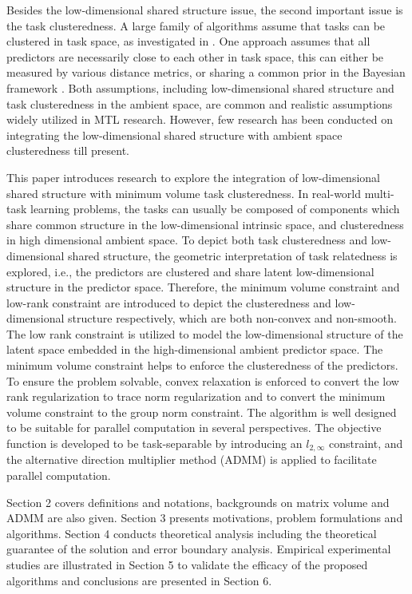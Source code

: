 \documentclass[twoside,leqno,twocolumn]{article}
\begin{document}
Besides the low-dimensional shared structure issue, the second important
issue is the task clusteredness. A large family of algorithms assume
that tasks can be clustered in  task space, as investigated in \cite{cmtl:icml2012:flexiblecluster:zhong2012convex,cmtl:ICML2012:Kumar_690,cmtl:NIPS2008:bach,cmtl:nips2011:zhou2011clustered}.
One approach assumes that all predictors are necessarily close to each other in
 task space, this can either be measured by various distance metrics, or sharing
a common prior in the Bayesian framework \cite{mtl:icml2005:yu2005learning,mtl:nips2005:ica:zhang2006learning}.
Both assumptions, including low-dimensional shared structure and task clusteredness in the ambient space, are common and realistic assumptions widely utilized in MTL research. 
However, few research has been conducted on integrating the low-dimensional shared structure with ambient space clusteredness till present.

This paper introduces research to explore the integration of low-dimensional
shared structure with minimum volume task clusteredness. In real-world
multi-task learning problems, the tasks can usually be composed of
components which share common structure in the low-dimensional intrinsic
space, and clusteredness in high dimensional ambient space. To depict both task clusteredness
and low-dimensional shared structure, the geometric
interpretation of task relatedness is explored, i.e., the predictors are
clustered and share latent low-dimensional structure in the predictor
space. Therefore, the minimum volume constraint and low-rank
constraint are introduced to depict the clusteredness and low-dimensional structure
respectively, which are both non-convex and non-smooth. The low rank
constraint is utilized to model the low-dimensional structure of the
latent space embedded in the high-dimensional ambient predictor space.
The minimum volume constraint helps to enforce the clusteredness of
the predictors. To ensure the problem solvable, convex relaxation is
enforced to convert the low rank regularization to trace norm regularization and to convert the minimum volume constraint to the group
norm constraint. The algorithm is well designed to be suitable for parallel
computation in several perspectives. The objective function is developed
to be task-separable by introducing an $l_{2,\infty}$ constraint, and the alternative direction multiplier method
(ADMM) is applied to facilitate parallel computation.

Section 2 covers definitions and notations, backgrounds on matrix volume and ADMM are also given. Section 3 presents motivations, problem formulations
and algorithms. Section 4 conducts theoretical analysis including the theoretical guarantee of the solution and error boundary analysis.
Empirical experimental studies are illustrated in Section 5 to validate the efficacy of the proposed algorithms and conclusions are presented in Section 6.
\end{document}

